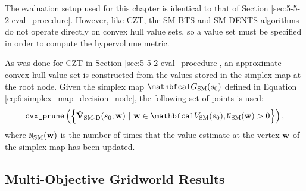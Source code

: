     The evaluation setup used for this chapter is identical to that of Section \ref{sec:5-5-2-eval_procedure}. However, like CZT, the SM-BTS and SM-DENTS algorithms do not operate directly on convex hull value sets, so a value set must be specified in order to compute the hypervolume metric.

    As was done for CZT in Section \ref{sec:5-5-2-eval_procedure}, an approximate convex hull value set is constructed from the values stored in the simplex map at the root node. Given the simplex map $\GSM(s_0)$ defined in Equation \eqref{eq:6:simplex_map_decision_node}, the following set of points is used:
    \begin{align}
        \cprune \left( \left\{ \Vsmd(s_0;\bff{w})\ |\ \bff{w}\in \VSM(s_0), \NSM(\bff{w}) > 0 
            \right\} \right),
    \end{align}
    where ${\textnormal{\texttt{N}}_{{\textnormal{SM}}}}(\mathbf{w})$ is the number of times that the value estimate at the vertex $\mathbf{w}$ of the simplex map has been updated.




\subsection{Multi-Objective Gridworld Results}
\label{sec:6-4-1-results_and_discussion}

